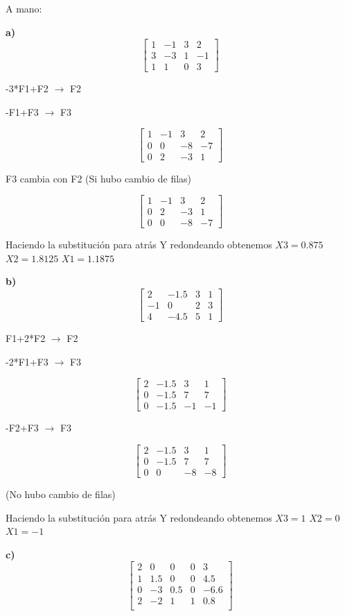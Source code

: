 \documentclass[12pt]{article}
\begin{document}
A mano:

\textbf{a)}
\[
\begin{bmatrix}
1 & -1 & 3 & 2 \\
3 & -3 & 1& -1 \\
1 & 1 & 0 & 3
\end{bmatrix}
\]

-3*F1+F2 $\longrightarrow $ F2

-F1+F3 $\longrightarrow $ F3

\[
\begin{bmatrix}
1 & -1 & 3 & 2 \\
0 & 0 & -8& -7 \\
0 & 2 & -3 & 1
\end{bmatrix}
\]

F3 cambia con F2 (Si hubo cambio de filas)

\[
\begin{bmatrix}
1 & -1 & 3 & 2 \\
0 & 2 & -3 & 1 \\
0 & 0 & -8 & -7
\end{bmatrix}
\]

Haciendo la substitución para atrás Y redondeando obtenemos
$X3 = 0.875$    $X2 =1.8125$  $X1 =1.1875$ 

\textbf{b)}
\[
\begin{bmatrix}
2 & -1.5 & 3 & 1 \\
-1 & 0 & 2& 3 \\
4 & -4.5 & 5 & 1
\end{bmatrix}
\]

F1+2*F2 $\longrightarrow $ F2

-2*F1+F3 $\longrightarrow $ F3

\[
\begin{bmatrix}
2 & -1.5 & 3 & 1 \\
0 & -1.5 & 7& 7 \\
0 & -1.5 & -1 & -1
\end{bmatrix}
\]

-F2+F3 $\longrightarrow $ F3

\[
\begin{bmatrix}
2 & -1.5 & 3 & 1 \\
0 & -1.5 & 7& 7 \\
0 & 0 & -8 & -8
\end{bmatrix}
\]

(No hubo cambio de filas)

Haciendo la substitución para atrás Y redondeando obtenemos
$X3 = 1$    $X2 =0$  $X1 =-1$ 

\textbf{c)}
\[
\begin{bmatrix}
2 & 0 & 0 & 0 & 3 \\
1 & 1.5 & 0& 0& 4.5 \\
0 & -3 & 0.5 & 0 & -6.6 \\
2 & -2 & 1 & 1 & 0.8 \\
\end{bmatrix}
\]
\end{document}
